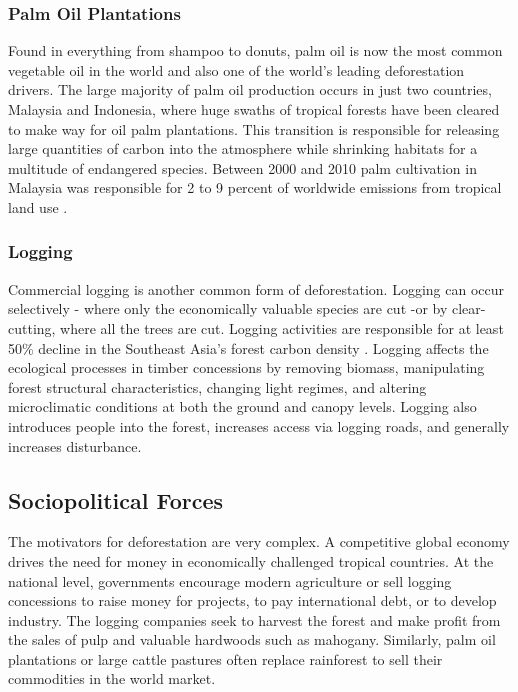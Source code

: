 \subsubsection{Palm Oil Plantations}

Found in everything from shampoo to donuts, palm oil is now the most common vegetable oil in the world and also one of the world's leading deforestation drivers. The large majority of palm oil production occurs in just two countries, Malaysia and Indonesia, where huge swaths of tropical forests have been cleared to make way for oil palm plantations. This transition is responsible for releasing large quantities of carbon into the atmosphere while shrinking habitats for a multitude of endangered species. Between 2000 and 2010 palm cultivation in Malaysia was responsible for 2 to 9 percent of worldwide emissions from tropical land use \citep{carlson2013refined}. 

\subsubsection{Logging} 

Commercial logging is another common form of deforestation. Logging can occur selectively - where only the economically valuable species are cut  -or by clear-cutting, where all the trees are cut. Logging activities are responsible for at least 50\% decline in the Southeast Asia's forest carbon density \citep{hawthorne2011impact}. Logging affects the ecological processes in timber concessions by removing biomass, manipulating forest structural characteristics, changing light regimes, and altering microclimatic conditions at both the ground and canopy levels. Logging also introduces people into the forest, increases access via logging roads, and generally increases disturbance. 

\subsection{Sociopolitical Forces}

The motivators for deforestation are very complex. A competitive global economy drives the need for money in economically challenged tropical countries. At the national level, governments encourage modern agriculture or sell logging concessions to raise money for projects, to pay international debt, or to develop industry. The logging companies seek to harvest the forest and make profit from the sales of pulp and valuable hardwoods such as mahogany. Similarly, palm oil plantations or large cattle pastures often replace rainforest to sell their commodities in the world market. 

